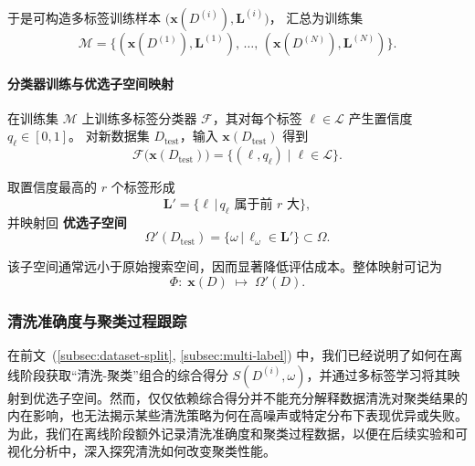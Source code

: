 \documentclass[10pt]{article} %
\numberwithin{equation}{section}
\begin{document}
\noindent 于是可构造多标签训练样本  
$\bigl(\mathbf{x}(D^{(i)}),\mathbf{L}^{(i)}\bigr)$，
汇总为训练集  
\begin{equation}\label{eq:training-set}
  \mathcal{M}=
  \bigl\{
    (\mathbf{x}(D^{(1)}),\mathbf{L}^{(1)}),\,\dots,\,
    (\mathbf{x}(D^{(N)}),\mathbf{L}^{(N)})
  \bigr\}.
\end{equation}

\paragraph{分类器训练与优选子空间映射}
在训练集 $\mathcal{M}$ 上训练多标签分类器 $\mathcal{F}$，其对每个标签 $\ell\!\in\!\mathcal{L}$ 产生置信度
$q_\ell\in[0,1]$。  
对新数据集 $D_{\text{test}}$，输入
${\mathbf{x}}(D_{\text{test}})$ 得到  
\begin{equation}\label{eq:classifier-output}
  \mathcal{F}\bigl(\mathbf{x}(D_{\text{test}})\bigr)
  =\bigl\{(\ell,q_\ell)\;\big|\;\ell\in\mathcal{L}\bigr\}.
\end{equation}

\noindent 取置信度最高的 $r$ 个标签形成  
\begin{equation}\label{eq:predicted-L}
  \mathbf{L}'=
  \{\ell\,|\,q_\ell\text{ 属于前 }r\text{ 大}\},
\end{equation}
并映射回 \textbf{优选子空间}  
\begin{equation}\label{eq:Omega-prime}
  \Omega'(D_{\text{test}})=
  \{\omega\,|\,\ell_{\omega}\in\mathbf{L}'\}\subset\Omega.
\end{equation}

\noindent 该子空间通常远小于原始搜索空间，因而显著降低评估成本。整体映射可记为  
\begin{equation}\label{eq:mapping-function}
  \Phi:\;
  \mathbf{x}(D)\;\longmapsto\;
  \Omega'(D).
\end{equation}

\subsubsection{清洗准确度与聚类过程跟踪}
\label{subsec:tracking}

在前文~(\ref{subsec:dataset-split}, \ref{subsec:multi-label}) 中，我们已经说明了如何在离线阶段获取“清洗-聚类”组合的综合得分 $S(D^{(i)}, \omega)$，并通过多标签学习将其映射到优选子空间。然而，仅仅依赖综合得分并不能充分解释数据清洗对聚类结果的内在影响，也无法揭示某些清洗策略为何在高噪声或特定分布下表现优异或失败。为此，我们在离线阶段额外记录清洗准确度和聚类过程数据，以便在后续实验和可视化分析中，深入探究清洗如何改变聚类性能。
\end{document}
